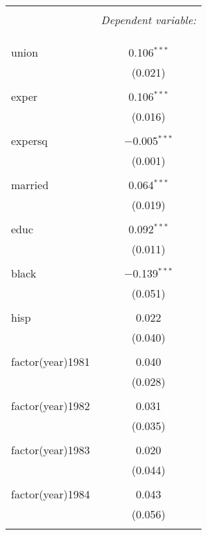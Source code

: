
\begin{table}[!htbp] \centering 
  \caption{} 
  \label{} 
\begin{tabular}{@{\extracolsep{5pt}}lc} 
\\[-1.8ex]\hline 
\hline \\[-1.8ex] 
 & \multicolumn{1}{c}{\textit{Dependent variable:}} \\ 
\cline{2-2} 
\\[-1.8ex] &   \\ 
\hline \\[-1.8ex] 
 union & 0.106$^{***}$ \\ 
  & (0.021) \\ 
  & \\ 
 exper & 0.106$^{***}$ \\ 
  & (0.016) \\ 
  & \\ 
 expersq & $-$0.005$^{***}$ \\ 
  & (0.001) \\ 
  & \\ 
 married & 0.064$^{***}$ \\ 
  & (0.019) \\ 
  & \\ 
 educ & 0.092$^{***}$ \\ 
  & (0.011) \\ 
  & \\ 
 black & $-$0.139$^{***}$ \\ 
  & (0.051) \\ 
  & \\ 
 hisp & 0.022 \\ 
  & (0.040) \\ 
  & \\ 
 factor(year)1981 & 0.040 \\ 
  & (0.028) \\ 
  & \\ 
 factor(year)1982 & 0.031 \\ 
  & (0.035) \\ 
  & \\ 
 factor(year)1983 & 0.020 \\ 
  & (0.044) \\ 
  & \\ 
 factor(year)1984 & 0.043 \\ 
  & (0.056) \\ 
  & \\ 

\end{tabular}
\end{table}
